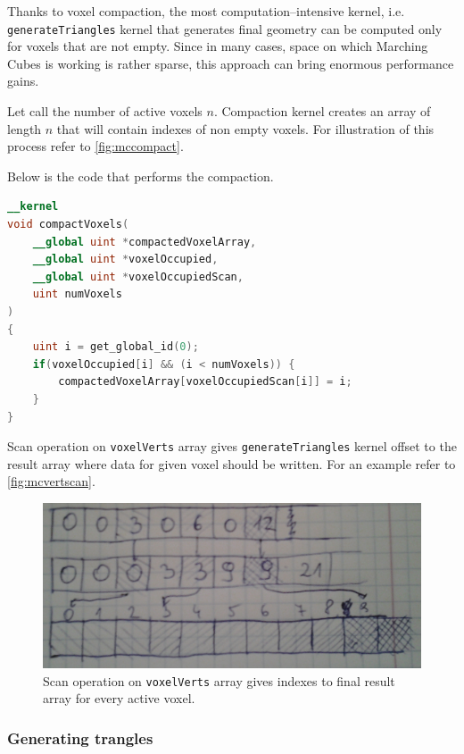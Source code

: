 Thanks to voxel compaction, the most computation--intensive kernel, i.e.
\texttt{generateTriangles} kernel that generates final geometry can be computed
only for voxels that are not empty. Since in many cases, space on which Marching
Cubes is working is rather sparse, this approach can bring enormous performance
gains.

Let call the number of active voxels $n$. Compaction kernel creates an array
of length $n$ that will contain indexes of non empty voxels. For illustration of
this process refer to \autoref{fig:mccompact}.

Below is the code that performs the compaction.
\begin{lstlisting}[language=opencl]
__kernel
void compactVoxels(
	__global uint *compactedVoxelArray,
	__global uint *voxelOccupied,
	__global uint *voxelOccupiedScan,
	uint numVoxels
)
{
	uint i = get_global_id(0);
	if(voxelOccupied[i] && (i < numVoxels)) {
		compactedVoxelArray[voxelOccupiedScan[i]] = i;
	}
}
\end{lstlisting}

Scan operation on \texttt{voxelVerts} array gives \texttt{generateTriangles}
kernel offset to the result array where data for given voxel should be written.
For an example refer to \autoref{fig:mcvertscan}.

\begin{figure}[b]
	\begin{center}
		\includegraphics[width=\textwidth]{chapters/marchingcubes/vertscan.jpg}
	\end{center}
	\caption{Scan operation on \texttt{voxelVerts} array gives indexes to
		final result array for every active voxel.
	}
	\label{fig:mcvertscan}
\end{figure}

\subsubsection{Generating trangles}

